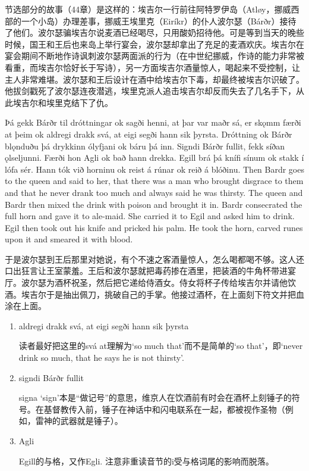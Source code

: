 节选部分的故事（44章）是这样的：埃吉尔一行前往阿特罗伊岛（Atløy，挪威西部的一个小岛）办理差事，挪威王埃里克（Eiríkr）的仆人波尔瑟（Bárðr）接待了他们。波尔瑟骗埃吉尔说麦酒已经喝尽，只用酸奶招待他。可是等到当天的晚些时候，国王和王后也来岛上举行宴会，波尔瑟却拿出了充足的麦酒欢庆。埃吉尔在宴会期间不断地作诗讽刺波尔瑟两面派的行为（在中世纪挪威，作诗的能力非常被看重，而埃吉尔恰好长于写诗），另一方面埃吉尔酒量惊人，喝起来不受控制，让主人非常难堪。波尔瑟和王后设计在酒中给埃吉尔下毒，却最终被埃吉尔识破了。他拔剑戳死了波尔瑟连夜潜逃，埃里克派人追击埃吉尔却反而失去了几名手下，从此埃吉尔和埃里克结下了仇。
\begin{paracol}{2}
  Þá gekk Bárðr til dróttningar ok sagði henni, at þar var maðr sá, er skǫmm færði at þeim ok aldregi drakk svá, at eigi segði hann sik þyrsta. Dróttning ok Bárðr blǫnduðu þá drykkinn ólyfjani ok báru þá inn. Signdi Bárðr fullit, fekk síðan ǫlseljunni. Færði hon Agli ok bað hann drekka. Egill brá þá knífi sínum ok stakk í lófa sér. Hann tók við horninu ok reist á rúnar ok reið á blóðinu.
  \switchcolumn
  Then Bardr goes to the queen and said to her, that there was a man who brought disgrace to them and that he never drank too much and always said he was thirsty. The queen and Bardr then mixed the drink with poison and brought it in. Bardr consecrated the full horn and gave it to ale-maid. She carried it to Egil and asked him to drink. Egil then took out his knife and pricked his palm. He took the horn, carved runes upon it and smeared it with blood.
\end{paracol}
\begin{translation*}{}
  于是波尔瑟到王后那里对她说，有个不速之客酒量惊人，怎么喝都喝不够。这人还口出狂言让王室蒙羞。王后和波尔瑟就把毒药掺在酒里，把装酒的牛角杯带进宴厅。波尔瑟为酒杯祝圣，然后把它递给侍酒女。侍女将杯子传给埃吉尔并请他饮酒。埃吉尔于是抽出佩刀，挑破自己的手掌。他接过酒杯，在上面刻下符文并把血涂在上面。
\end{translation*}
\begin{grammar*}{}
  \begin{enumerate}[leftmargin=*]
    \item aldregi drakk svá, at eigi segði hann sik þyrsta

          读者最好把这里的svá at理解为`so much that'而不是简单的`so that'，即`never drink so much, that he says he is not thirsty'.
    \item signdi Bárðr fullit

          signa `sign'本是“做记号”的意思，维京人在饮酒前有时会在酒杯上刻锤子的符号。在基督教传入前，锤子在神话中和闪电联系在一起，都被视作圣物（例如，雷神的武器就是锤子）。
    \item Agli

          Egill的与格，又作Egli. 注意非重读音节的i受与格词尾的影响而脱落。
  \end{enumerate}
\end{grammar*}
